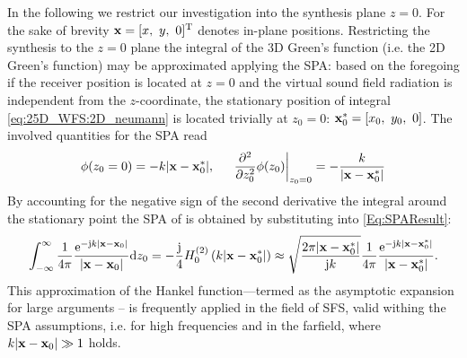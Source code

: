 \vspace{3mm}
In the following we restrict our investigation into the synthesis plane $z=0$. For the sake of brevity $\vx = [x,\ y,\ 0]^{\mathrm{T}}$ denotes in-plane positions.
Restricting the synthesis to the $z=0$ plane the integral of the 3D Green's function (i.e. the 2D Green's function) may be approximated applying the SPA: based on the foregoing if the receiver position is located at $z=0$ and the virtual sound field radiation is independent from the $z$-coordinate, the stationary position of integral \eqref{eq:25D_WFS:2D_neumann} is located trivially at $z_0=0$: $\mathbf{x}_0^* = [x_0,\ y_0,\ 0]$.
The involved quantities for the SPA read
\begin{equation}
\phi(z_0=0) = -k|\mathbf{x}-\mathbf{x}_0^*|, \hspace{5mm} \left. \frac{\partial^2}{\partial z_0^2} \phi(z_0)\right|_{z_0=0} = -\frac{k}{|\mathbf{x}-\mathbf{x}_0^*|}
\end{equation}
By accounting for the negative sign of the second derivative the integral around the stationary point the SPA of is obtained by substituting into \eqref{Eq:SPAResult}:
\begin{equation}
\int_{-\infty}^{\infty} \frac{1}{4\pi} \frac{\mathrm{e}^{-\mathrm{j} k |\mathbf{x}-\mathbf{x}_0| }}{|\mathbf{x}-\mathbf{x}_0|}\mathrm{d} z_0 = -\frac{\mathrm{j}}{4} H_0^{(2)}\left( k|\mathbf{x}-\mathbf{x}_0^*| \right) \approx 
\sqrt{\frac{2\pi |\mathbf{x}-\mathbf{x}_0^*|}{\mathrm{j} k}} \frac{1}{4\pi}  \frac{\mathrm{e}^{-\mathrm{j} k |\mathbf{x}-\mathbf{x}_0^*| }}{|\mathbf{x}-\mathbf{x}_0^*|}.
\label{Eq:25D_WFS:Hankel_approx}
\end{equation}
This approximation of the Hankel function---termed as the asymptotic expansion for large arguments \cite[(10.2.6)]{Nist2010}-- is frequently applied in the field of SFS, valid withing the SPA assumptions, i.e. for high frequencies and in the farfield, where $k|\mathbf{x}-\mathbf{x}_0|\gg 1$ holds.

